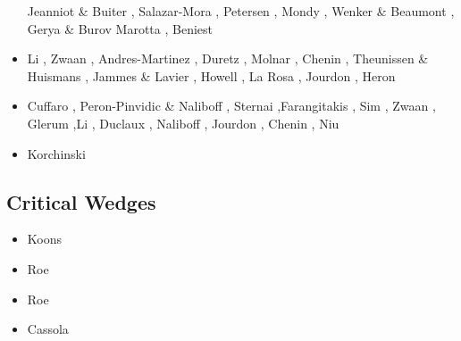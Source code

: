 \begin{scriptsize}
\begin{itemize}
                      Jeanniot \& Buiter \cite{jebu18}, Salazar-Mora \etal \cite{sahf18},
                      Petersen \etal \cite{pesn18}, Mondy \etal \cite{mord18},
                      Wenker \& Beaumont \cite{webe18,webe18b},
                      Gerya \& Burov \cite{gebu18} Marotta \etal \cite{marc18},
                      Beniest \etal \cite{bews18} 
\item[\twothousandnineteen] Li \etal \cite{lisp19}, Zwaan \etal \cite{zwsb19}, 
                      Andres-Martinez \etal \cite{anpa19}, Duretz \etal \cite{dual19},
                      Molnar \etal \cite{mocb19}, Chenin \etal \cite{chmd19},
                      Theunissen \& Huismans \cite{thhu19}, Jammes \& Lavier \cite{jala19},
                      Howell \etal \cite{hooi19}, La Rosa \etal \cite{lapk19}, 
                      Jourdon \etal \cite{jolm19}, Heron \etal \cite{hepm19}
\item[\twothousandtwenty] Cuffaro \etal \cite{cump20}, Peron-Pinvidic \& Naliboff \cite{pena20}, 
                          Sternai \cite{ster20},Farangitakis \etal \cite{fahm20}, Sim \etal \cite{siss20}, 
                          Zwaan \etal \cite{zwsr20}, Glerum \etal \cite{glbs20},Li \etal \cite{lial20}, 
                          Duclaux \etal \cite{duhm20}, Naliboff \etal \cite{nagb20}, 
                          Jourdon \etal \cite{jolm20}, Chenin \etal \cite{chsm20}, 
                          Niu \cite{niu20}
\item[\twothousandtwentyone] Korchinski \etal \cite{kotr21}
\end{itemize}
\end{scriptsize}

\subsection{Critical Wedges}

\begin{scriptsize}
\begin{itemize}
\item[\nineteenninetyfour] Koons \cite{koon94}
\item[\twothousandsix] Roe \etal \cite{rosw06}
\item[\twothousandeight] Roe \etal \cite{rowf08}
\item[\twothousandthirteen] Cassola \cite{cass13}
\end{itemize}
\end{scriptsize}

